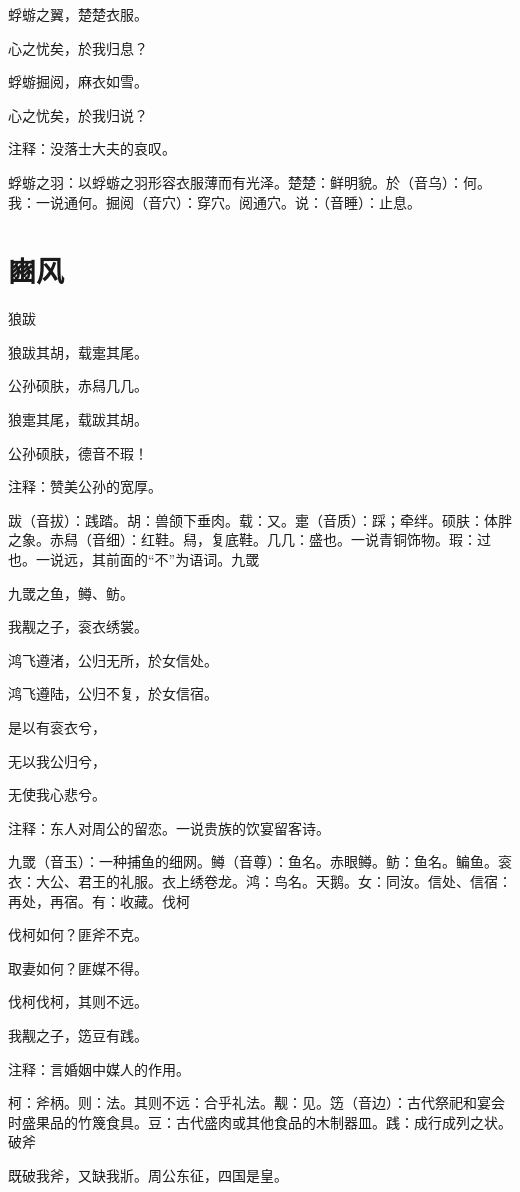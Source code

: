 \documentclass[12pt,UTF8]{ctexbook}
\begin{document}
蜉蝣之翼，楚楚衣服。

心之忧矣，於我归息？

蜉蝣掘阅，麻衣如雪。

心之忧矣，於我归说？

注释：没落士大夫的哀叹。

蜉蝣之羽：以蜉蝣之羽形容衣服薄而有光泽。楚楚：鲜明貌。於（音乌）：何。我：一说通何。掘阅（音穴）：穿穴。阅通穴。说：（音睡）：止息。



\part{豳风}

狼跋

狼跋其胡，载疐其尾。

公孙硕肤，赤舄几几。

狼疐其尾，载跋其胡。

公孙硕肤，德音不瑕！

注释：赞美公孙的宽厚。

跋（音拔）：践踏。胡：兽颌下垂肉。载：又。疐（音质）：踩；牵绊。硕肤：体胖之象。赤舄（音细）：红鞋。舄，复底鞋。几几：盛也。一说青铜饰物。瑕：过也。一说远，其前面的“不”为语词。九罭

九罭之鱼，鳟、鲂。

我觏之子，衮衣绣裳。

鸿飞遵渚，公归无所，於女信处。

鸿飞遵陆，公归不复，於女信宿。

是以有衮衣兮，

无以我公归兮，

无使我心悲兮。

注释：东人对周公的留恋。一说贵族的饮宴留客诗。

九罭（音玉）：一种捕鱼的细网。鳟（音尊）：鱼名。赤眼鳟。鲂：鱼名。鳊鱼。衮衣：大公、君王的礼服。衣上绣卷龙。鸿：鸟名。天鹅。女：同汝。信处、信宿：再处，再宿。有：收藏。伐柯

伐柯如何？匪斧不克。

取妻如何？匪媒不得。

伐柯伐柯，其则不远。

我觏之子，笾豆有践。

注释：言婚姻中媒人的作用。

柯：斧柄。则：法。其则不远：合乎礼法。觏：见。笾（音边）：古代祭祀和宴会时盛果品的竹篾食具。豆：古代盛肉或其他食品的木制器皿。践：成行成列之状。破斧

既破我斧，又缺我斨。周公东征，四国是皇。
\end{document}
